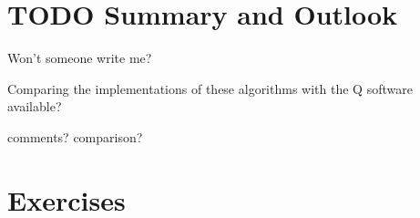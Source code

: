 \begin{comment}
Four (five?) languages will be covered here: 
\begin{itemize}
    \item Quil
    \item QISKit 
    \item Project Q
    \item Q\# (same QDK)
    \item Cirq? anyone?
\end{itemize}

Algorithms to implement:
\begin{itemize}
    \item Grover's algorithm (as example) (Ankur and David have already organised this one, so it'd be nice :3)
    \item Shor's algorithm (as example)
    \item Deutsch's algorithm (as exercise)
\end{itemize}
\end{comment}







\section{TODO Summary and Outlook}

Won't someone write me?

Comparing the implementations of these algorithms with the Q software available?

comments? comparison?

\section{Exercises}


